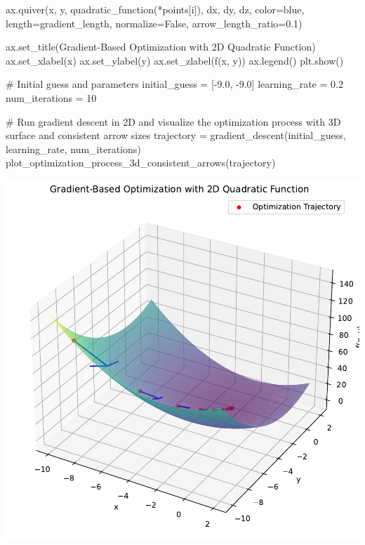\documentclass[
  letterpaper,
  DIV=11,
  numbers=noendperiod]{scrreprt}
\newenvironment{Shaded}{\begin{snugshade}}{\end{snugshade}}
\newcommand{\CommentTok}[1]{\textcolor[rgb]{0.37,0.37,0.37}{#1}}
\newcommand{\DecValTok}[1]{\textcolor[rgb]{0.68,0.00,0.00}{#1}}
\newcommand{\FloatTok}[1]{\textcolor[rgb]{0.68,0.00,0.00}{#1}}
\newcommand{\NormalTok}[1]{\textcolor[rgb]{0.00,0.23,0.31}{#1}}
\newcommand{\OperatorTok}[1]{\textcolor[rgb]{0.37,0.37,0.37}{#1}}
\newcommand{\StringTok}[1]{\textcolor[rgb]{0.13,0.47,0.30}{#1}}
\newcommand{\VariableTok}[1]{\textcolor[rgb]{0.07,0.07,0.07}{#1}}
\begin{document}
\begin{tcolorbox}
\begin{Shaded}
\begin{Highlighting}[]
\NormalTok{        ax.quiver(x, y, quadratic\_function(}\OperatorTok{*}\NormalTok{points[i]), dx, dy, dz, color}\OperatorTok{=}\StringTok{\textquotesingle{}blue\textquotesingle{}}\NormalTok{, length}\OperatorTok{=}\NormalTok{gradient\_length, normalize}\OperatorTok{=}\VariableTok{False}\NormalTok{, arrow\_length\_ratio}\OperatorTok{=}\FloatTok{0.1}\NormalTok{)}

\NormalTok{    ax.set\_title(}\StringTok{\textquotesingle{}Gradient{-}Based Optimization with 2D Quadratic Function\textquotesingle{}}\NormalTok{)}
\NormalTok{    ax.set\_xlabel(}\StringTok{\textquotesingle{}x\textquotesingle{}}\NormalTok{)}
\NormalTok{    ax.set\_ylabel(}\StringTok{\textquotesingle{}y\textquotesingle{}}\NormalTok{)}
\NormalTok{    ax.set\_zlabel(}\StringTok{\textquotesingle{}f(x, y)\textquotesingle{}}\NormalTok{)}
\NormalTok{    ax.legend()}
\NormalTok{    plt.show()}

\CommentTok{\# Initial guess and parameters}
\NormalTok{initial\_guess }\OperatorTok{=}\NormalTok{ [}\OperatorTok{{-}}\FloatTok{9.0}\NormalTok{, }\OperatorTok{{-}}\FloatTok{9.0}\NormalTok{]}
\NormalTok{learning\_rate }\OperatorTok{=} \FloatTok{0.2}
\NormalTok{num\_iterations }\OperatorTok{=} \DecValTok{10}

\CommentTok{\# Run gradient descent in 2D and visualize the optimization process with 3D surface and consistent arrow sizes}
\NormalTok{trajectory }\OperatorTok{=}\NormalTok{ gradient\_descent(initial\_guess, learning\_rate, num\_iterations)}
\NormalTok{plot\_optimization\_process\_3d\_consistent\_arrows(trajectory)}
\end{Highlighting}
\end{Shaded}

\includegraphics{003_scipy_optimize_intro_files/figure-pdf/cell-8-output-1.pdf}

\end{tcolorbox}
\end{document}
